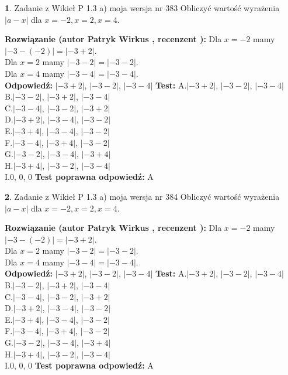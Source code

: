 \documentclass[12pt, a4paper]{article}
\theoremstyle{definition} %
\newtheorem{zad}{}
\newcommand{\zadStart}[1]{\begin{zad}#1\newline}
\newcommand{\zadStop}{\end{zad}}
\newcommand{\rozwStart}[2]{\noindent \textbf{Rozwiązanie (autor #1 , recenzent #2): }\newline}
\newcommand{\rozwStop}{\newline}
\newcommand{\odpStart}{\noindent \textbf{Odpowiedź:}\newline}
\newcommand{\odpStop}{\newline}
\newcommand{\testStart}{\noindent \textbf{Test:}\newline}
\newcommand{\testStop}{\newline}
\newcommand{\kluczStart}{\noindent \textbf{Test poprawna odpowiedź:}\newline}
\newcommand{\kluczStop}{\newline}
\begin{document}
\zadStart{Zadanie z Wikieł P 1.3 a) moja wersja nr 383}
Obliczyć wartość wyrażenia $|a - x|$ dla $x=-2,x=2,x=4$.
\zadStop
\rozwStart{Patryk Wirkus}{}
Dla $x = -2$ mamy $|-3 - (-2)| = |-3 + 2|$.\\
Dla $x = 2$ mamy $|-3 - 2| = |-3 - 2|$.\\
Dla $x = 4$ mamy $|-3 - 4| = |-3 - 4|$.\\
\rozwStop
\odpStart
$|-3 + 2|$, $|-3 - 2|$, $|-3 - 4|$
\odpStop
\testStart
A.$|-3 + 2|$, $|-3 - 2|$, $|-3 - 4|$\\
B.$|-3 - 2|$, $|-3 + 2|$, $|-3 - 4|$\\
C.$|-3 - 4|$, $|-3 - 2|$, $|-3 + 2|$\\
D.$|-3 + 2|$, $|-3 - 4|$, $|-3 - 2|$\\
E.$|-3 + 4|$, $|-3 - 4|$, $|-3 - 2|$\\
F.$|-3 - 4|$, $|-3 + 4|$, $|-3 - 2|$\\
G.$|-3 - 2|$, $|-3 - 4|$, $|-3 + 4|$\\
H.$|-3 + 4|$, $|-3 - 2|$, $|-3 - 4|$\\
I.$0$, $0$, $0$
\testStop
\kluczStart
A
\kluczStop



\zadStart{Zadanie z Wikieł P 1.3 a) moja wersja nr 384}
Obliczyć wartość wyrażenia $|a - x|$ dla $x=-2,x=2,x=4$.
\zadStop
\rozwStart{Patryk Wirkus}{}
Dla $x = -2$ mamy $|-3 - (-2)| = |-3 + 2|$.\\
Dla $x = 2$ mamy $|-3 - 2| = |-3 - 2|$.\\
Dla $x = 4$ mamy $|-3 - 4| = |-3 - 4|$.\\
\rozwStop
\odpStart
$|-3 + 2|$, $|-3 - 2|$, $|-3 - 4|$
\odpStop
\testStart
A.$|-3 + 2|$, $|-3 - 2|$, $|-3 - 4|$\\
B.$|-3 - 2|$, $|-3 + 2|$, $|-3 - 4|$\\
C.$|-3 - 4|$, $|-3 - 2|$, $|-3 + 2|$\\
D.$|-3 + 2|$, $|-3 - 4|$, $|-3 - 2|$\\
E.$|-3 + 4|$, $|-3 - 4|$, $|-3 - 2|$\\
F.$|-3 - 4|$, $|-3 + 4|$, $|-3 - 2|$\\
G.$|-3 - 2|$, $|-3 - 4|$, $|-3 + 4|$\\
H.$|-3 + 4|$, $|-3 - 2|$, $|-3 - 4|$\\
I.$0$, $0$, $0$
\testStop
\kluczStart
A
\kluczStop
\end{document}
